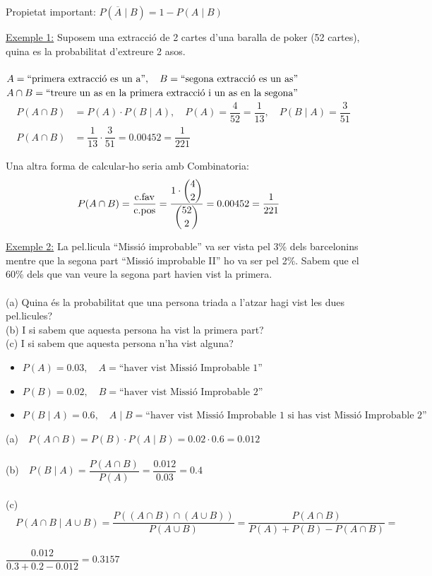 \documentclass{article}
\begin{document}
Propietat important: $P(\overline{A}\mid B) = 1 - P(A\mid B)$

\underline{Exemple 1:} Suposem una extracció de 2 cartes d'una baralla de poker (52 cartes), quina es la probabilitat d'extreure 2 asos. \\\\
$A = \space \textrm{``primera extracció es un a''}, \quad B = \space \textrm{``segona extracció es un as''}$ \\
$A \cap B = \space \textrm{``treure un as en la primera extracció i un as en la segona''}$
\begin{align*}
P(A \cap B) &= P(A) \cdot P(B\mid A), \quad P(A) = \dfrac{4}{52} = \dfrac{1}{13}, \quad P(B\mid A) = \dfrac{3}{51} \\
P(A \cap B) &= \dfrac{1}{13} \cdot \dfrac{3}{51} = 0.00452 = \dfrac{1}{221}
\end{align*}

Una altra forma de calcular-ho seria amb Combinatoria:
\begin{align*}
P(A \cap B) &= \dfrac{\textrm{c.fav}}{\textrm{c.pos}} = \dfrac{1 \cdot \dbinom{4}{2}}{\dbinom{52}{2}} = 0.00452 = \dfrac{1}{221}
\end{align*}

\underline{Exemple 2:} La pel.licula “Missió improbable” va ser vista pel 3\% dels barcelonins mentre que
la segona part “Missió improbable II” ho va ser pel 2\%. Sabem que el 60\% dels que van veure la
segona part havien vist la primera. \\\\
(a) Quina és la probabilitat que una persona triada a l’atzar hagi vist les dues pel.licules? \\
(b) I si sabem que aquesta persona ha vist la primera part? \\
(c) I si sabem que
aquesta persona n’ha vist alguna?
\begin{itemize}
    \item $P(A) = 0.03,\quad A = \textrm{``haver vist Missió Improbable 1''}$ 
    \item $P(B) = 0.02,\quad B = \textrm{``haver vist Missió Improbable 2''}$ 
    \item $P(B\mid A) = 0.6,\quad A \mid B = \textrm{``haver vist Missió Improbable 1 si has vist Missió Improbable 2''}$
\end{itemize}
(a)$\quad P(A \cap B) = P(B) \cdot P(A\mid B) = 0.02 \cdot 0.6 = 0.012$ \\\\
(b)$\quad P(B\mid A) =  \dfrac{P(A\cap B)}{P(A)} = \dfrac{0.012}{0.03} = 0.4$ \\\\
(c)$\quad P(A\cap B \mid A \cup B) = \dfrac{P((A\cap B)\cap(A\cup B))}{P(A \cup B)} = \dfrac{P(A\cap B)}{P(A) + P(B) - P(A\cap B)} =$ \\\\
$\dfrac{0.012}{0.3 + 0.2 - 0.012} = 0.3157$
\end{document}
